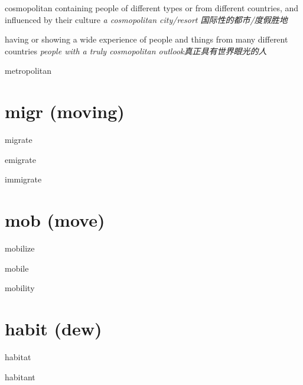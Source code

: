 \begin{RefWord}{cosmopolitan}
    containing people of different types or from different countries, and influenced by their culture
    \textit{a cosmopolitan city/resort 国际性的都市/度假胜地}

    having or showing a wide experience of people and things from many different countries
    \textit{people with a truly cosmopolitan outlook真正具有世界眼光的人}
\end{RefWord}

\begin{RefWord}{metropolitan}
\end{RefWord}

\section{migr (moving)}

\begin{RefWord}{migrate}
\end{RefWord}

\begin{RefWord}{emigrate}
\end{RefWord}

\begin{RefWord}{immigrate}
\end{RefWord}

\section{mob (move)}

\begin{RefWord}{mobilize}
\end{RefWord}

\begin{RefWord}{mobile}
\end{RefWord}

\begin{RefWord}{mobility}
\end{RefWord}


\section{habit (dew)}

\begin{RefWord}{habitat}
\end{RefWord}

\begin{RefWord}{habitant}
\end{RefWord}

